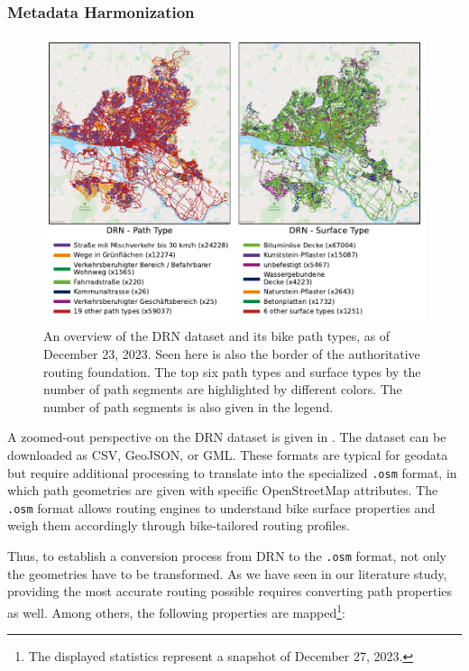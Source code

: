 \subsubsection{Metadata Harmonization}

\begin{figure}[t]
\centering
\includegraphics[width=\linewidth]{images/routing-drn.pdf}
\caption{An overview of the DRN dataset and its bike path types, as of December 23, 2023. Seen here is also the border of the authoritative routing foundation. The top six path types and surface types by the number of path segments are highlighted by different colors. The number of path segments is also given in the legend.}
\label{fig:drn-map}
\end{figure}

A zoomed-out perspective on the DRN dataset is given in . The dataset can be downloaded as CSV, GeoJSON, or GML. These formats are typical for geodata but require additional processing to translate into the specialized \texttt{.osm} format, in which path geometries are given with specific OpenStreetMap attributes. The \texttt{.osm} format allows routing engines to understand bike surface properties and weigh them accordingly through bike-tailored routing profiles.  

Thus, to establish a conversion process from DRN to the \texttt{.osm} format, not only the geometries have to be transformed. As we have seen in our literature study, providing the most accurate routing possible requires converting path properties as well. Among others, the following properties are mapped\footnote{The displayed statistics represent a snapshot of December 27, 2023.}:

